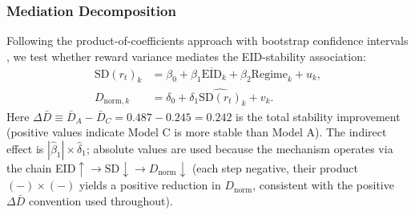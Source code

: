 \documentclass[12pt]{article}
\begin{document}
\subsubsection{Mediation Decomposition}

Following the product-of-coefficients approach with bootstrap confidence
intervals \citet{preacher2008}, we test whether reward variance mediates
the EID-stability association:
\begin{align}
  \mathrm{SD}(r_t)_{k} &= \beta_0 + \beta_1\overline{\mathrm{EID}}_k
    + \beta_2\mathrm{Regime}_k + u_k, \label{eq:step1}\\
  D_{\mathrm{norm},k} &= \delta_0
    + \delta_1\widehat{\mathrm{SD}(r_t)}_k + v_k. \label{eq:step2}
\end{align}
Here $\Delta\bar{D}\equiv\bar{D}_A-\bar{D}_C=0.487-0.245=0.242$ is the
total stability improvement (positive values indicate Model C is more
stable than Model A). The indirect effect is
$|\hat{\beta}_1|\times\hat{\delta}_1$; absolute values are used because
the mechanism operates via the chain
EID$\uparrow\to\mathrm{SD}\downarrow\to D_{\mathrm{norm}}\downarrow$
(each step negative, their product $(-)\times(-)$ yields a positive
reduction in $D_{\mathrm{norm}}$, consistent with the positive $\Delta\bar{D}$
convention used throughout).
\end{document}
